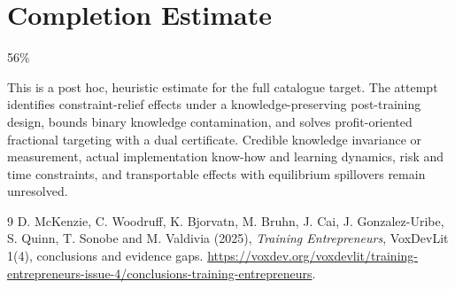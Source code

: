 \documentclass[11pt]{article}
\theoremstyle{definition}
\begin{document}
\section{Completion Estimate}
56\%

This is a post hoc, heuristic estimate for the full catalogue target.
The attempt identifies constraint-relief effects under a knowledge-preserving post-training design, bounds binary knowledge contamination, and solves profit-oriented fractional targeting with a dual certificate. Credible knowledge invariance or measurement, actual implementation know-how and learning dynamics, risk and time constraints, and transportable effects with equilibrium spillovers remain unresolved.

\begin{thebibliography}{9}
 D. McKenzie, C. Woodruff, K. Bjorvatn, M. Bruhn, J. Cai, J. Gonzalez-Uribe, S. Quinn, T. Sonobe and M. Valdivia (2025), \emph{Training Entrepreneurs}, VoxDevLit 1(4), conclusions and evidence gaps. \url{https://voxdev.org/voxdevlit/training-entrepreneurs-issue-4/conclusions-training-entrepreneurs}.
\end{thebibliography}
\end{document}

